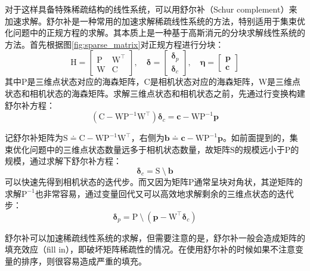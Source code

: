 对于这样具备特殊稀疏结构的线性系统，可以用舒尔补（Schur complement）来加速求解。舒尔补是一种常用的加速求解稀疏线性系统的方法，特别适用于集束优化问题中的正规方程的求解。其本质上是一种基于高斯消元的分块求解线性系统的方法。首先根据图\ref{fig:sparse_matrix}对正规方程进行分块：
\begin{equation}
    \mathrm{H} =
    \begin{bmatrix}
        \mathrm{P} & \mathrm{W}^\top \\
        \mathrm{W} & \mathrm{C}
    \end{bmatrix}, \quad
    \bm{\delta} = \begin{bmatrix} \bm{\delta}_p \\ \bm{\delta}_c \end{bmatrix}, \quad
    \bm{\eta} = \begin{bmatrix} \bm{p} \\ \bm{c} \end{bmatrix}
\end{equation}
其中$\mathrm{P}$是三维点状态对应的海森矩阵，$\mathrm{C}$是相机状态对应的海森矩阵，$\mathrm{W}$是三维点状态和相机状态的海森矩阵。求解三维点状态和相机状态之前，先通过行变换构建舒尔补方程：
\begin{equation}
    \left( \mathrm{C}-\mathrm{W}\mathrm{P}^{-1}\mathrm{W}^\top \right)
    \bm{\delta}_c = \bm{c}-\mathrm{W}\mathrm{P}^{-1}\bm{p}
    \label{eq:schur_complement}
\end{equation}

记舒尔补矩阵为$\mathrm{S}\doteq\mathrm{C}-\mathrm{W}\mathrm{P}^{-1}\mathrm{W}^\top$，右侧为$\bm{b}\doteq\bm{c}-\mathrm{W}\mathrm{P}^{-1}\bm{p}$。如前面提到的，集束优化问题中的三维点状态数量远多于相机状态数量，故矩阵$\mathrm{S}$的规模远小于$\mathrm{P}$的规模，通过求解下舒尔补方程：
\begin{equation}
    \bm{\delta}_c = \mathrm{S} \:\setminus\: \bm{b}
    \label{eq:solve_schur}
\end{equation}
可以快速先得到相机状态的迭代步。而又因为矩阵$\mathrm{P}$通常呈块对角状，其逆矩阵的求解$\mathrm{P}^{-1}$也非常容易，通过变量回代又可以高效地求解剩余的三维点状态的迭代步：
\begin{equation}
    \bm{\delta}_p = \mathrm{P}
    \:\setminus\:
    \left( \bm{p}-\mathrm{W}^\top\bm{\delta}_c \right)
    \label{eq:back_sub}
\end{equation}

舒尔补可以加速稀疏线性系统的求解，但需要注意的是，舒尔补一般会造成矩阵的填充效应（fill in）\citep{kaess2008isam}，即破坏矩阵稀疏性的情况。在使用舒尔补的时候如果不注意变量的排序，则很容易造成严重的填充。

